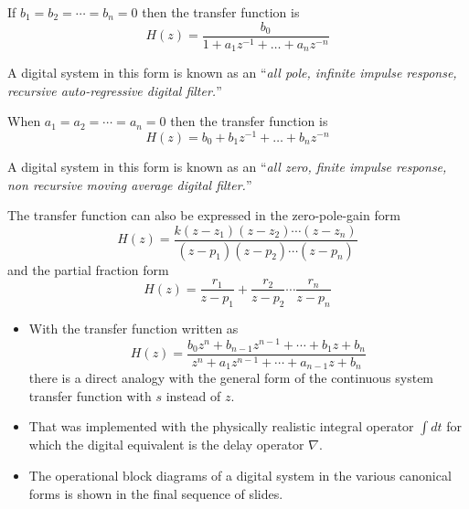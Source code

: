 \begin{slide}\label{slide:l9s2} 
If $b_1 = b_2 = \cdots = b_n = 0$ then the transfer function is
\[H(z) = \frac{b_0}{1 + a_1z^{-1} + \ldots + a_n z^{-n}}\]

A digital system in this form is known as an ``\emph{all pole,
infinite impulse response, recursive auto-regressive digital
filter.}''
\end{slide}

\begin{slide}\label{slide:l9s3} 
When $a_1 = a_2 = \cdots = a_n = 0$ then the transfer function is
\[H(z) = b_0 + b_{1}z^{-1} + \ldots + b_n
z^{-n}\]

A digital system in this form is known as an ``\emph{all zero,
finite impulse response, non recursive moving average digital
filter.}''
\end{slide}
\begin{slide}
The transfer function can also be expressed in the
zero-pole-gain form
\[H(z) = \frac{k(z-z_1)(z-z_2)\cdots(z-z_n)}{(z-p_1)(z-p_2)\cdots(z-p_n)}\]
and the partial fraction form
\[H(z) = \frac{r_1}{z-p_1}+\frac{r_2}{z-p_2}\cdots\frac{r_n}{z-p_n}\]
\end{slide}

\begin{slide}\label{slide:l9s4} 
\begin{itemize}
\item With the transfer function written as
\[H(z) = \frac{b_0 z^n + b_{n-1} z^{n-1} + \cdots + b_1 z + b_n}{z^n + a_1 z^{n-1} + \cdots + a_{n-1} z + b_n}\]
there is a direct analogy with the general form of the continuous
system transfer function with $s$ instead of $z$. \item That was
implemented with the physically realistic integral operator $\int
dt$ for which the digital equivalent is the delay operator
$\nabla$. \item The operational block diagrams of a digital system
in the various canonical forms is shown in the final sequence of
slides.
\end{itemize}
\end{slide}

\begin{slide}\label{slide:l9s14}
\end{slide}

